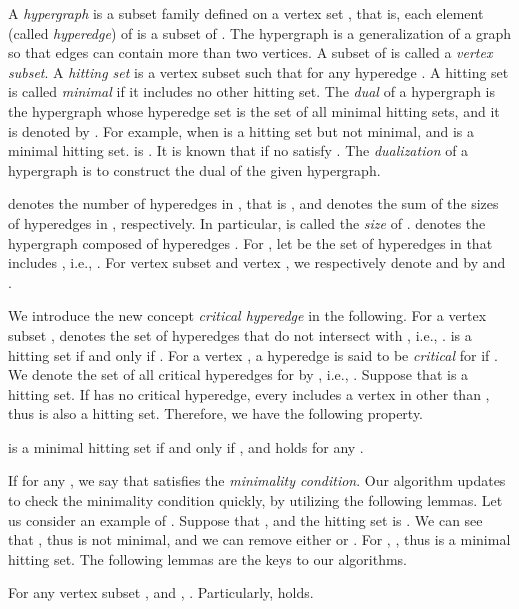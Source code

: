 A {\em hypergraph}  is a subset family 
 defined on a vertex set , that is, each element (called {\em hyperedge})
  of  is a subset of .
The hypergraph is a generalization of a graph so that edges can contain more
 than two vertices.
A subset  of  is called a {\em vertex subset}.
A {\em hitting set} is a vertex subset 
 such that  for any hyperedge .
A hitting set is called {\em minimal} if it includes no other hitting set.
The {\em dual} of a hypergraph is the hypergraph whose hyperedge set is the
 set of all minimal hitting sets, and it is denoted by .
For example, when 
  is a hitting set but not minimal, and  is a minimal
 hitting set.
 is .
It is known that  if no 
 satisfy .
The {\em dualization} of a hypergraph is to construct the dual of the
 given hypergraph.

 denotes the number of hyperedges in , that is ,
 and  denotes the sum of the sizes of hyperedges in ,
 respectively.
In particular,  is called the {\em size} of .
 denotes the hypergraph composed of hyperedges
 .
For , let  be the set of hyperedges in  that
 includes , i.e., .
For vertex subset  and vertex , we respectively denote 
 and  by  and .

We introduce the new concept {\em critical hyperedge} in the following.
For a vertex subset ,  denotes the set of
 hyperedges that do not intersect with , i.e.,
 .
 is a hitting set if and only if .
For a vertex , a hyperedge  is said to be
 {\em critical} for  if .
We denote the set of all critical hyperedges for  by , 
 i.e., .
Suppose that  is a hitting set.
If  has no critical hyperedge, every  includes a vertex
 in  other than , thus  is also a hitting set.
Therefore, we have the following property.

\begin{property}\label{crit}
 is a minimal hitting set if and only if ,
 and  holds for any .
\end{property}

If  for any , we say that  satisfies the {\em minimality condition}.
Our algorithm updates  to check the minimality condition quickly,
 by utilizing the following lemmas.
Let us consider an example of .
Suppose that ,
 and the hitting set  is .
We can see that , thus  is not minimal, and we can remove either
  or .
For , ,
 thus  is a minimal hitting set.
The following lemmas are the keys to our algorithms.

\begin{lemma}\label{up}
For any vertex subset ,  and ,
 .
Particularly,  holds.
\end{lemma}

